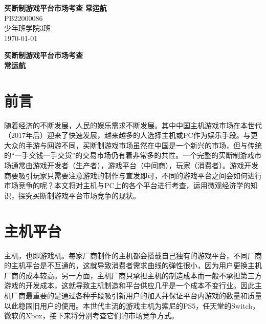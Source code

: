 \documentclass{ctexart}
\begin{document}
\begin{titlepage}
   \begin{center}
    \vspace*{1cm}
    \Huge
    \textbf{买断制游戏平台市场考查}
    \vspace{0.3cm}
    \vfill
    \huge
    \textbf{常运航}\\
    \vspace{0.8cm}
    \vspace{1.5cm}
    \LARGE      
    PB22000086\\
    少年班学院3班\\
    \today\\
   \end{center}
\end{titlepage}
\pagestyle{empty}
\begin{center}
    \huge
    \textbf{买断制游戏平台市场考查}
    \\
    \vspace{0.4cm}
    \LARGE
    \vspace{0.4cm}
    \textbf{常运航}
\end{center}

\vspace{1.5cm}
\section{前言}
随着经济的不断发展，人民的娱乐需求不断发展。其中中国主机游戏市场在本世代（2017年后）迎来了快速发展，越来越多的人选择主机或PC作为娱乐手段。与更大众的手游与网游不同，买断制游戏市场虽然在中国是一个新兴的市场，但与传统的“一手交钱一手交货”的交易市场仍有着非常多的共性。一个完整的买断制游戏市场通常由游戏开发者（生产者），游戏平台（中间商），玩家（消费者）。游戏开发商要吸引玩家只需要注意游戏的制作与宣发即可，不同的游戏平台之间会如何进行市场竞争的呢？本文将对主机与PC上的各个平台进行考查，运用微观经济学的知识，探究买断制游戏平台市场竞争的现状。

\section{主机平台}
主机，也即游戏机。每家厂商制作的主机都会搭载自己独有的游戏平台，不同厂商的主机平台是不互通的，这就导致消费者需求曲线的弹性很小，因为用户更换主机厂商的成本较高。另一方面，主机厂商只承担主机的制造成本而一般不承担第三方游戏的开发成本，这就导致主机制造和平台供应几乎是一个成本不变行业。因此主机厂商最重要的是通过各种手段吸引新用户的加入并保证平台内游戏的数量和质量以此稳固旧用户的使用。本世代主流的游戏主机为索尼的PS5，任天堂的Switch，微软的Xbox，接下来将分别考查它们的市场竞争方式。
\end{document}
